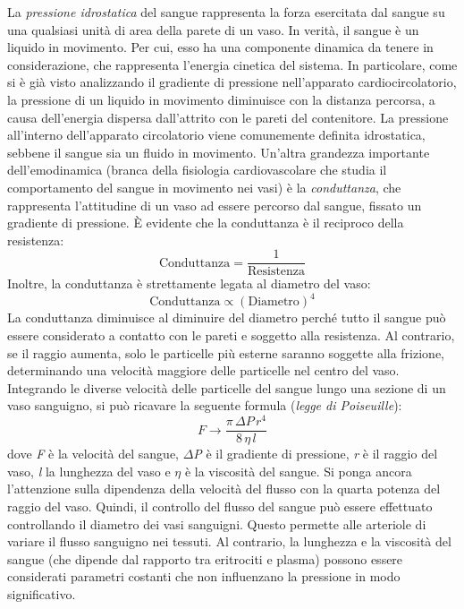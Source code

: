 La \textit{pressione idrostatica} del sangue rappresenta la forza esercitata dal sangue su una qualsiasi unità di area della parete di un vaso. In verità, il sangue è un liquido in movimento. Per cui, esso ha una componente dinamica da tenere in considerazione, che rappresenta l'energia cinetica del sistema. In particolare, come si è già visto analizzando il gradiente di pressione nell'apparato cardiocircolatorio, la pressione di un liquido in movimento diminuisce con la distanza percorsa, a causa dell'energia dispersa dall'attrito con le pareti del contenitore. La pressione all'interno dell'apparato circolatorio viene comunemente definita idrostatica, sebbene il sangue sia un fluido in movimento. Un'altra grandezza importante dell'emodinamica (branca della fisiologia cardiovascolare che studia il comportamento del sangue in movimento nei vasi) è la \textit{conduttanza}, che rappresenta l'attitudine di un vaso ad essere percorso dal sangue, fissato un gradiente di pressione. \`E evidente che la conduttanza è il reciproco della resistenza: 
\begin{equation}
	\text{Conduttanza}=\frac{1}{\text{Resistenza}}
	\label{eq:Conduttanza}
\end{equation}
Inoltre, la conduttanza è strettamente legata al diametro del vaso: 
\begin{equation}
	\text{Conduttanza}\propto(\text{Diametro})^4
	\label{eq:ConduttanzaeDiametro}
\end{equation}
La conduttanza diminuisce al diminuire del diametro perché tutto il sangue può essere considerato a contatto con le pareti e soggetto alla resistenza. Al contrario, se il raggio aumenta, solo le particelle più esterne saranno soggette alla frizione, determinando una velocità maggiore delle particelle nel centro del vaso.
Integrando le diverse velocità delle particelle del sangue lungo una sezione di un vaso sanguigno, si può ricavare la seguente formula (\textit{legge di Poiseuille}):
\begin{equation}
	F\xrightarrow{}\frac{\pi \, \Delta P \, r^4}{8 \, \eta \, l}
	\label{eq:PoiseuilleLaw}
\end{equation}
dove \textit{F} è la velocità del sangue, \textit{$\Delta$P} è il gradiente di pressione, \textit{r} è il raggio del vaso, \textit{l} la lunghezza del vaso e \textit{$\eta$} è la viscosità del sangue. Si ponga ancora l'attenzione sulla dipendenza della velocità del flusso con la quarta potenza del raggio del vaso. Quindi, il controllo del flusso del sangue può essere effettuato controllando il diametro dei vasi sanguigni. Questo permette alle arteriole di variare il flusso sanguigno nei tessuti. Al contrario, la lunghezza e la viscosità del sangue (che dipende dal rapporto tra eritrociti e plasma) possono essere considerati parametri costanti che non influenzano la pressione in modo significativo.

